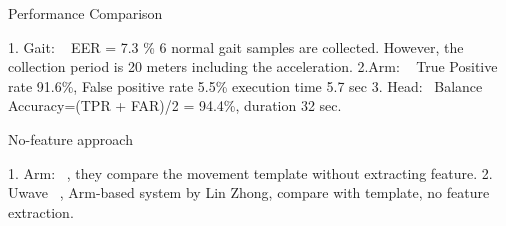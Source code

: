 Performance Comparison

1. Gait: ~\cite{gafurov2006biometric} EER  = 7.3 \% 6 normal gait samples are collected. However, the collection period is 20 meters including the acceleration. 
2.Arm: ~\cite{ahmed2015checksum} True Positive rate 91.6\%, False positive rate 5.5\%    execution time 5.7 sec
3. Head:~\cite{rogers2015approach} Balance Accuracy=(TPR + FAR)/2 = 94.4\%, duration 32 sec.


No-feature approach

1. Arm: ~\cite{ahmed2015checksum}, they compare the movement template without extracting feature.
2.  Uwave ~\cite{liu2009uwave}, Arm-based system by Lin Zhong, compare with template, no feature extraction.

